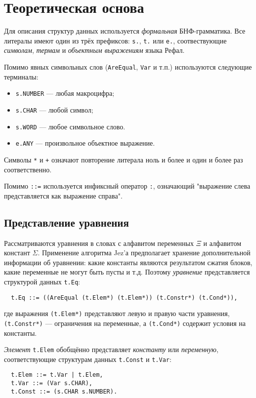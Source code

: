 \documentclass[12pt]{article}
\begin{document}
\section{Теоретическая основа}

Для описания структур данных используется \textit{формальная} БНФ-грамматика.
Все литералы имеют один из трёх префиксов: \texttt{s.}, \texttt{t.} или
\texttt{e.}, соотвествующие \textit{символам}, \textit{термам} и
\textit{объектным выражениям} языка Рефал.

Помимо явных символьных слов (\texttt{AreEqual}, \texttt{Var} и т.п.)
используются следующие терминалы:
\begin{itemize}
  \item \texttt{s.NUMBER} --- любая макроцифра; 
  \item \texttt{s.CHAR} --- любой символ; 
  \item \texttt{s.WORD} --- любое символьное слово.
  \item \texttt{e.ANY} --- произвольное объектное выражение.
\end{itemize}

Символы \texttt{*} и \texttt{+} означают повторение литерала ноль и более и
один и более раз соответственно.

Помимо \texttt{::=} используется инфиксный оператор \texttt{:}, означающий
"выражение слева представляется как выражение справа".

\subsection{Представление уравнения}

Рассматриваются уравнения в словах с алфавитом переменных $\Xi$ и алфавитом
констант $\Sigma$. Применение алгоритма Jez'а предполагает хранение
дополнительной информации об уравнении: какие константы являются результатом
сжатия блоков, какие переменные не могут быть пусты и т.д. Поэтому
\textit{уравнение} представляется структурой данных \texttt{t.Eq}:
\begin{Verbatim}
  t.Eq ::= ((AreEqual (t.Elem*) (t.Elem*)) (t.Constr*) (t.Cond*)),
\end{Verbatim}
где выражения \texttt{(t.Elem*)} представляют левую и правую части уравнения,
\texttt{(t.Constr*)} --- ограничения на переменные, а \texttt{(t.Cond*)}
содержит условия на константы.

\textit{Элемент} \texttt{t.Elem} обобщённо представляет \textit{константу} или
\textit{переменную}, соответствующие структурам данных \texttt{t.Const} и
\texttt{t.Var}:
\begin{Verbatim}
  t.Elem ::= t.Var | t.Elem,
  t.Var ::= (Var s.CHAR),
  t.Const ::= (s.CHAR s.NUMBER).
\end{Verbatim}
\end{document}
